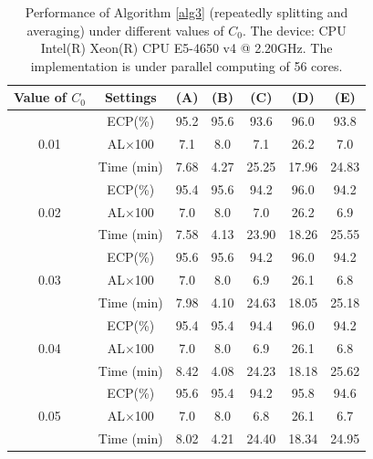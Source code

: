 \documentclass[11pt]{article}
\theoremstyle{referenceplain}
\theoremstyle{referencedefinition}
\theoremstyle{referenceremark}
\begin{document}
\begin{table}[H]
\centering
\scriptsize
\begin{tabular}{|c|c|c|c|c|c|c|}
\hline
Value of ${C_0}$        & Settings      & (A)  & (B)  & (C)   & (D)   & (E)   \\ \hline
\multirow{3}{*}{0.01} & ECP(\%)       & 95.2 & 95.6 & 93.6  & 96.0  & 93.8  \\ \cline{2-7} 
                      & AL$\times$100 & 7.1  & 8.0  & 7.1  & 26.2  & 7.0  \\ \cline{2-7} 
                      & Time (min)    & 7.68 & 4.27 & 25.25 & 17.96 & 24.83 \\ \hline
\multirow{3}{*}{0.02} & ECP(\%)       & 95.4 & 95.6 & 94.2  & 96.0  & 94.2  \\ \cline{2-7} 
                      & AL$\times$100 & 7.0 & 8.0  & 7.0  & 26.2  & 6.9  \\ \cline{2-7} 
                      & Time (min)    & 7.58 & 4.13 & 23.90 & 18.26 & 25.55 \\ \hline
\multirow{3}{*}{0.03} & ECP(\%)       & 95.6 & 95.6 & 94.2  & 96.0  & 94.2  \\ \cline{2-7} 
                      & AL$\times$100 & 7.0  & 8.0  & 6.9  & 26.1  & 6.8  \\ \cline{2-7} 
                      & Time (min)    & 7.98 & 4.10 & 24.63 & 18.05 & 25.18 \\ \hline
\multirow{3}{*}{0.04} & ECP(\%)       & 95.4 & 95.4 & 94.4  & 96.0  & 94.2  \\ \cline{2-7} 
                      & AL$\times$100 & 7.0  & 8.0  & 6.9  & 26.1  & 6.8  \\ \cline{2-7} 
                      & Time (min)    & 8.42 & 4.08 & 24.23 & 18.18 & 25.62 \\ \hline
\multirow{3}{*}{0.05} & ECP(\%)       & 95.6 & 95.4 & 94.2  & 95.8  & 94.6  \\ \cline{2-7} 
                      & AL$\times$100 & 7.0  & 8.0  & 6.8  & 26.1  & 6.7  \\ \cline{2-7} 
                      & Time (min)    & 8.02 & 4.21 & 24.40 & 18.34 & 24.95 \\ \hline
\end{tabular}
\caption{Performance of Algorithm \ref{alg3} (repeatedly splitting and averaging) under different values of ${C_0}$. The device: CPU Intel(R) Xeon(R) CPU E5-4650 v4 @ 2.20GHz. The implementation is under parallel computing of 56 cores.}
\label{tab5}
\end{table}
\end{document}
